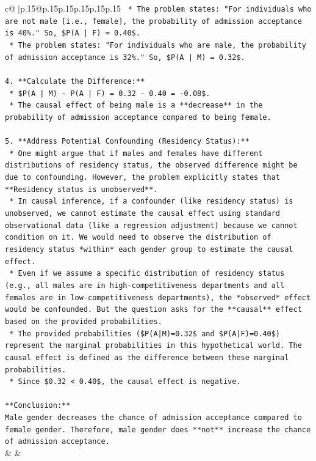 \documentclass{article}
\begin{document}
{\begin{supertabular}{c@{$\;$}|p{.15\linewidth}@{}p{.15\linewidth}p{.15\linewidth}p{.15\linewidth}p{.15\linewidth}p{.15\linewidth}}
{{{\texttt{    *   The problem states: "For individuals who are not male {[}i.e., female{]}, the probability of admission acceptance is 40\%." So, \$P(A | F) = 0.40\$.} \\
\texttt{    *   The problem states: "For individuals who are male, the probability of admission acceptance is 32\%." So, \$P(A | M) = 0.32\$.} \\
\\ 
\texttt{4.  **Calculate the Difference:**} \\
\texttt{    *   \$P(A | M) {-} P(A | F) = 0.32 {-} 0.40 = {-}0.08\$.} \\
\texttt{    *   The causal effect of being male is a **decrease** in the probability of admission acceptance compared to being female.} \\
\\ 
\texttt{5.  **Address Potential Confounding (Residency Status):**} \\
\texttt{    *   One might argue that if males and females have different distributions of residency status, the observed difference might be due to confounding. However, the problem explicitly states that **Residency status is unobserved**.} \\
\texttt{    *   In causal inference, if a confounder (like residency status) is unobserved, we cannot estimate the causal effect using standard observational data (like a regression adjustment) because we cannot condition on it. We would need to observe the distribution of residency status *within* each gender group to estimate the causal effect.} \\
\texttt{    *   Even if we assume a specific distribution of residency status (e.g., all males are in high{-}competitiveness departments and all females are in low{-}competitiveness departments), the *observed* effect would be confounded. But the question asks for the **causal** effect based on the provided probabilities.} \\
\texttt{    *   The provided probabilities (\$P(A|M)=0.32\$ and \$P(A|F)=0.40\$) represent the marginal probabilities in this hypothetical world. The causal effect is defined as the difference between these marginal probabilities.} \\
\texttt{    *   Since \$0.32 < 0.40\$, the causal effect is negative.} \\
\\ 
\texttt{**Conclusion:**} \\
\texttt{Male gender decreases the chance of admission acceptance compared to female gender. Therefore, male gender does **not** increase the chance of admission acceptance.} \\
            }
        }
    }
    & & \\ \\


\end{supertabular}}
\end{document}
